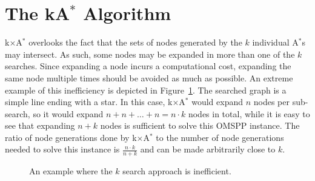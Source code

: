 \documentclass[smallextended]{svjour3}       %
\newcommand{\omspp}{\ac{OMSPP}\xspace}
\newcommand{\astar}{A$^*$\xspace}
\newcommand{\kastar}{kA$^*$\xspace}
\newcommand{\kxastar}{k$\times$A$^*$\xspace}
\newcommand{\roni}[1]{\textbf{[RS:#1]}}
\begin{document}





\section{The \kastar Algorithm}
\label{sec:one-k-goal-search}



\kxastar overlooks the fact that the sets of nodes generated by the $k$ individual \astar{}s may intersect.
As such, some nodes may be expanded in more than one of the $k$ searches.
Since expanding a node incurs a computational cost, expanding the same node multiple times should be avoided as much as possible. An extreme example of this inefficiency is depicted in Figure~\ref{fig:k-search-bad}.
The searched graph is a simple line ending with a star. %
In this case, \kxastar would expand $n$ nodes per sub-search, so it would expand $n + n + \dots + n = n\cdot k$ nodes in total, while it is easy to see that expanding $n + k$ nodes is sufficient to solve this \omspp instance. 
The ratio of node generations done by \kxastar to the number of node generations needed to solve this instance is $\frac{n\cdot k}{n + k}$ and can be made arbitrarily close to $k$.
\begin{figure}
  \centering
  \caption{An example where the $k$ search approach is inefficient.}
  \label{fig:k-search-bad}
\end{figure}
\end{document}
